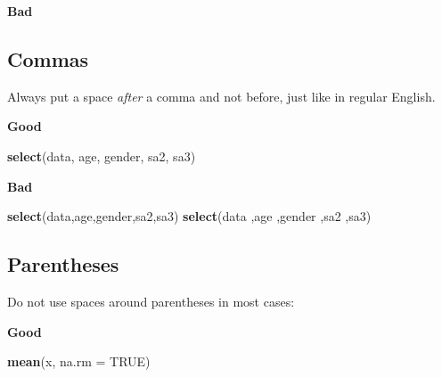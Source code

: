\documentclass[]{book}
\newenvironment{Shaded}{\begin{snugshade}}{\end{snugshade}}
\newcommand{\DataTypeTok}[1]{\textcolor[rgb]{0.13,0.29,0.53}{#1}}
\newcommand{\DecValTok}[1]{\textcolor[rgb]{0.00,0.00,0.81}{#1}}
\newcommand{\KeywordTok}[1]{\textcolor[rgb]{0.13,0.29,0.53}{\textbf{#1}}}
\newcommand{\NormalTok}[1]{#1}
\newcommand{\OperatorTok}[1]{\textcolor[rgb]{0.81,0.36,0.00}{\textbf{#1}}}
\newcommand{\OtherTok}[1]{\textcolor[rgb]{0.56,0.35,0.01}{#1}}
\newcommand{\StringTok}[1]{\textcolor[rgb]{0.31,0.60,0.02}{#1}}
\begin{document}
\textbf{Bad}

\begin{Shaded}
\end{Shaded}

\hypertarget{commas}{%
\subsection{Commas}\label{commas}}

Always put a space \emph{after} a comma and not before, just like in regular English.

\textbf{Good}

\begin{Shaded}
\begin{Highlighting}[]
\KeywordTok{select}\NormalTok{(data, age, gender, sa2, sa3)}
\end{Highlighting}
\end{Shaded}

\textbf{Bad}

\begin{Shaded}
\begin{Highlighting}[]
\KeywordTok{select}\NormalTok{(data,age,gender,sa2,sa3)}
\KeywordTok{select}\NormalTok{(data ,age ,gender ,sa2 ,sa3)}
\end{Highlighting}
\end{Shaded}

\hypertarget{parentheses}{%
\subsection{Parentheses}\label{parentheses}}

Do not use spaces around parentheses in most cases:

\textbf{Good}

\begin{Shaded}
\begin{Highlighting}[]
\KeywordTok{mean}\NormalTok{(x, }\DataTypeTok{na.rm =} \OtherTok{TRUE}\NormalTok{)}
\end{Highlighting}
\end{Shaded}
\end{document}
